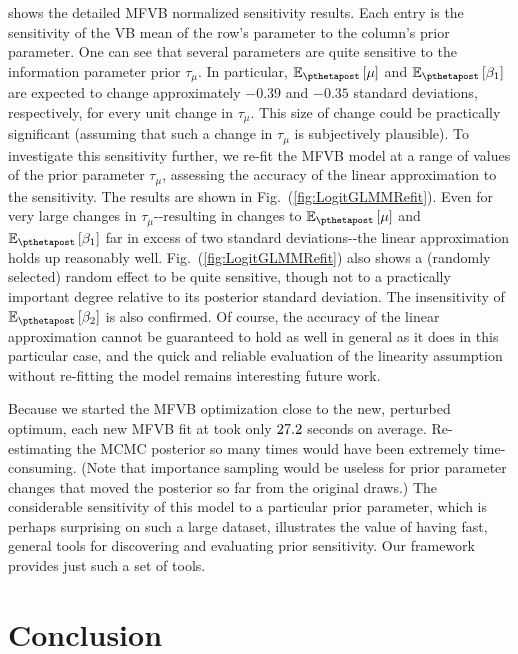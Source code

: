 \documentclass{article}\usepackage[]{graphicx}\usepackage[]{color}
\theoremstyle{plain}
\theoremstyle{definition}
\theoremstyle{plain}
\theoremstyle{plain}
\theoremstyle{plain}
\theoremstyle{plain}
\newcommand{\fig}[1]{Fig.~(\ref{fig:#1})}
\begin{document}
 shows the detailed MFVB normalized sensitivity
results. Each entry is the sensitivity of the VB mean of the row's
parameter to the column's prior parameter. One can see that several
parameters are quite sensitive to the information parameter prior
$\tau_{\mu}.$ In particular, $\mbe_{\pthetapost}\left[\mu\right]$
and $\mbe_{\pthetapost}\left[\beta_{1}\right]$ are expected to change
approximately $-0.39$ and $-0.35$ standard deviations, respectively,
for every unit change in $\tau_{\mu}$. This size of change could
be practically significant (assuming that such a change in $\tau_{\mu}$
is subjectively plausible). To investigate this sensitivity further,
we re-fit the MFVB model at a range of values of the prior parameter
$\tau_{\mu}$, assessing the accuracy of the linear approximation
to the sensitivity. The results are shown in \fig{LogitGLMMRefit}.
Even for very large changes in $\tau_{\mu}$-\textendash -resulting
in changes to $\mbe_{\pthetapost}\left[\mu\right]$ and $\mbe_{\pthetapost}\left[\beta_{1}\right]$
far in excess of two standard deviations-\textendash -the linear approximation
holds up reasonably well. \fig{LogitGLMMRefit} also shows a (randomly
selected) random effect to be quite sensitive, though not to a practically
important degree relative to its posterior standard deviation. The
insensitivity of $\mbe_{\pthetapost}\left[\beta_{2}\right]$ is also
confirmed. Of course, the accuracy of the linear approximation cannot
be guaranteed to hold as well in general as it does in this particular
case, and the quick and reliable evaluation of the linearity assumption
without re-fitting the model remains interesting future work.

Because we started the MFVB optimization close to the new, perturbed
optimum, each new MFVB fit at took only $27.2$ seconds
on average. Re-estimating the MCMC posterior so many times would have
been extremely time-consuming. (Note that importance sampling would
be useless for prior parameter changes that moved the posterior so
far from the original draws.) The considerable sensitivity of this
model to a particular prior parameter, which is perhaps surprising
on such a large dataset, illustrates the value of having fast, general
tools for discovering and evaluating prior sensitivity. Our framework
provides just such a set of tools.

\section{Conclusion\label{sec:Conclusion}}
\end{document}
